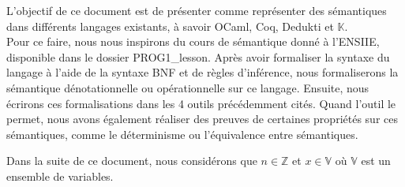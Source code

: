 L'objectif de ce document est de présenter comme représenter des sémantiques dans différents langages existants, à savoir OCaml, Coq, Dedukti et $\mathbb{K}$. \\
	Pour ce faire, nous nous inspirons du cours de sémantique donné à l'ENSIIE, disponible dans le dossier PROG1\_lesson. Après avoir formaliser la syntaxe du langage à l'aide de la syntaxe BNF et de règles d'inférence, nous formaliserons la sémantique dénotationnelle ou opérationnelle sur ce langage. Ensuite, nous écrirons ces formalisations dans les 4 outils précédemment cités. Quand l'outil le permet, nous avons également réaliser des preuves de certaines propriétés sur ces sémantiques, comme le déterminisme ou l'équivalence entre sémantiques.
	
	Dans la suite de ce document, nous considérons que $n \in \mathbb{Z}$ et $x \in \mathbb{V}$ où $\mathbb{V}$ est un ensemble de variables.